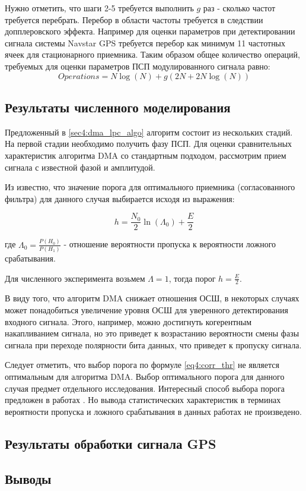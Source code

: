 Нужно отметить, что шаги 2-5 требуется выполнить ${g}$ раз - сколько частот требуется перебрать.
Перебор в области частоты требуется в следствии допплеровского эффекта. Например для оценки 
параметров при детектировании сигнала системы Navstar GPS требуется перебор как минимум
11 частотных ячеек для стационарного приемника.
Таким образом общее количество операций, требуемых для оценки параметров ПСП модулированного
сигнала равно:
\begin{equation}
	Operations = N \log (N) + g(2N + 2N \log (N)) 
\end{equation}

\subsection{Результаты численного моделирования}
Предложенный в \ref{sec4:dma_lpc_algo} алгоритм состоит из нескольких стадий. На первой стадии необходимо получить фазу ПСП. Для
оценки сравнительных характеристик алгоритма DMA со стандартным подходом, рассмотрим прием сигнала с известной фазой и
амплитудой.

Из \cite{pestryakov-book} известно, что значение порога для оптимального приемника (согласованного фильтра) для данного случая выбирается
исходя из выражения:
\begin{center}
\begin{equation}
	\label{eq4:corr_thr}
	h = \frac{N_0}{2} \ln(\Lambda_0) + \frac{E}{2}
\end{equation}
\end{center}
где ${\Lambda_0=\frac{P(H_0)}{P(H_1)}}$ - отношение вероятности пропуска к вероятности ложного срабатывания.

Для численного эксперимента возьмем ${\Lambda=1}$, тогда порог ${h=\frac{E}{2}}$.

В виду того, что алгоритм DMA снижает отношения ОСШ, в некоторых случаях может понадобиться увеличение уровня ОСШ для
уверенного детектирования входного сигнала. Этого, например, можно достигнуть когерентным накапливанием сигнала, но
это приведет к возрастанию вероятности смены фазы сигнала при переходе полярности бита данных, что приведет к пропуску сигнала.

Следует отметить, что выбор порога по формуле \ref{eq4:corr_thr} не является оптимальным для алгоритма DMA. Выбор оптимального
порога для данного случая предмет отдельного исследования. Интересный способ выбора порога предложен в работах \cite{2max_article, 2max_ieee}.
Но вывода статистических характеристик в терминах вероятности пропуска и ложного срабатывания в данных работах не произведено.

\subsection{Результаты обработки сигнала GPS}

\subsection*{Выводы}

\newpage
